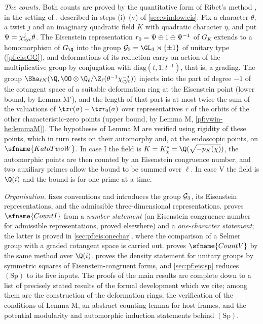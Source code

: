 \emph{The counts.} Both counts are proved by the quantitative form of Ribet's method \cite{Ribet1976}, in the
setting of \cite{BellaicheChenevier2009}, described in steps (i)--(v) of \cref{sec:window:eis}. Fix a character
$\theta$, a twist $j$ and an imaginary quadratic field $K$ with quadratic character $\eta$, and put
$\Psi=\chi_{\mathrm{cyc}}^j\theta$. The Eisenstein representation $r_0=\Psi\oplus1\oplus\Psi^{-1}$ of $G_K$ extends to a
homomorphism of $G_\Q$ into the group $\eisGG=\GL_3\rtimes\{\pm1\}$ of unitary type (\cref{pf:eis:GG}), and
deformations of its reduction carry an action of the multiplicative group by conjugation with
$\mathrm{diag}(t,1,t^{-1})$, that is, a grading. The group $\Sha_{\ell N}(\Q,\OO\otimes\eisQZ(\theta^{-1}\eiscyc^{-j}))$
injects into the part of degree $-1$ of the cotangent space of a suitable deformation ring at the Eisenstein
point (lower bound, by Lemma M$'$), and the length of that part is at most twice the sum of the valuations of
$\tr r(\sigma)-\tr\eisrz(\sigma)$ over representatives $r$ of the orbits of the other characteristic-zero points
(upper bound, by Lemma M, \cref{pf:vwin-he:lemmaM}). The hypotheses of Lemma M are verified using rigidity of
these points, which in turn rests on their automorphy and, at the endoscopic points, on $\sfname{KatoTwoW}$. In
case I the field is $K=K^*_\chi=\Q(\sqrt{-p_K(\chi)})$, the automorphic points are then counted by an Eisenstein
congruence number, and two auxiliary primes allow the bound to be summed over $\ell$. In case V the field is
$\Q(i)$ and the bound is for one prime at a time.

\emph{Organisation.}  fixes conventions and introduces the group $\mathcal G_3$, its Eisenstein
representations, and the admissible three-dimensional representations.  proves
$\sfname{CountI}$ from a \emph{number statement} (an Eisenstein congruence number for admissible
representations, proved elsewhere) and a \emph{one-character statement}; the latter is proved in
\cref{sec:pf:eis:onechar}, where the comparison of a Selmer group with a graded cotangent space is carried out.
 proves $\sfname{CountV}$ by the same method over $\Q(i)$.  proves
the density statement for unitary groups by symmetric squares of Eisenstein-congruent forms, and
\cref{sec:pf:eis:sp} reduces $(\mathrm{Sp})$ to its five inputs. The proofs of the main results are complete
down to a list of precisely stated results of the formal development which we cite; among them are the
construction of the deformation rings, the verification of the conditions of Lemma M, an abstract counting
lemma for host frames, and the potential modularity and automorphic induction statements behind $(\mathrm{Sp})$.

